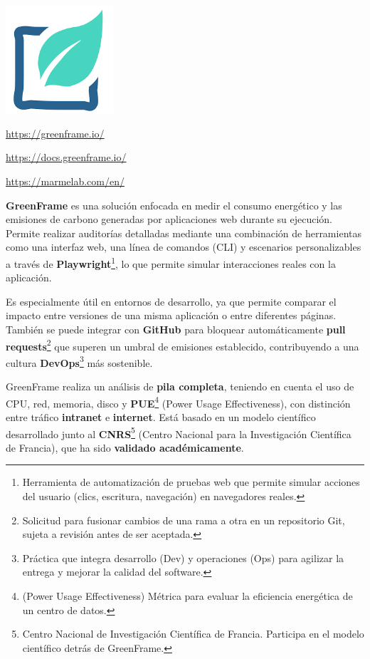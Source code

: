 \documentclass[12pt,a4paper]{report}
\begin{document}
\begin{center}
\includegraphics[width=0.3\textwidth]{imagenes/GreenFrame_Logo.png}
\end{center}

\url{https://greenframe.io/}

\url{https://docs.greenframe.io/}

\url{https://marmelab.com/en/}

\textbf{GreenFrame} es una solución enfocada en medir el consumo energético y las emisiones de carbono generadas por aplicaciones web durante su ejecución. Permite realizar auditorías detalladas mediante una combinación de herramientas como una interfaz web, una línea de comandos (CLI) y escenarios personalizables a través de \textbf{Playwright}\footnote{Herramienta de automatización de pruebas web que permite simular acciones del usuario (clics, escritura, navegación) en navegadores reales.}, lo que permite simular interacciones reales con la aplicación.

Es especialmente útil en entornos de desarrollo, ya que permite comparar el
impacto entre versiones de una misma aplicación o entre diferentes páginas.
También se puede integrar con \textbf{GitHub} para bloquear automáticamente \textbf{pull
  requests}\footnote{Solicitud para fusionar cambios de una rama a otra en un
  repositorio Git, sujeta a revisión antes de ser aceptada.} que superen un
umbral de emisiones establecido, contribuyendo a una cultura
\textbf{DevOps}\footnote{Práctica que integra desarrollo (Dev) y operaciones
  (Ops) para agilizar la entrega y mejorar la calidad del software.} más
sostenible.

GreenFrame realiza un análisis de \textbf{pila completa}, teniendo en cuenta el
uso de CPU, red, memoria, disco y \textbf{PUE}\footnote{(Power Usage
  Effectiveness) Métrica para evaluar la eficiencia energética de un centro de
  datos.} (Power Usage Effectiveness), con distinción entre tráfico
\textbf{intranet} e \textbf{internet}. Está basado en un modelo científico
desarrollado junto al \textbf{CNRS}\footnote{Centro Nacional de Investigación
  Científica de Francia. Participa en el modelo científico detrás de GreenFrame.}
(Centro Nacional para la Investigación Científica de Francia), que ha sido
\textbf{validado académicamente}.
\end{document}
